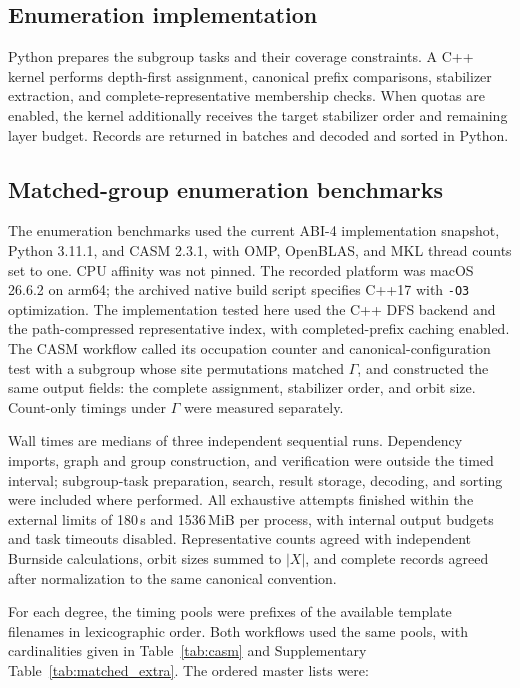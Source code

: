 \documentclass[a5paper, 10pt]{article}
\begin{document}
\subsection{Enumeration implementation}
\label{app:enumeration_implementation}

\begingroup\setlength{\emergencystretch}{3em}
Python prepares the subgroup tasks and their coverage constraints. A C++ kernel performs depth-first assignment, canonical prefix comparisons, stabilizer extraction, and complete-representative membership checks. When quotas are enabled, the kernel additionally receives the target stabilizer order and remaining layer budget. Records are returned in batches and decoded and sorted in Python.
\par\endgroup

\begingroup\setlength{\emergencystretch}{3em}
\subsection{Matched-group enumeration benchmarks}
\label{app:enum_benchmark}

The enumeration benchmarks used the current ABI-4 implementation snapshot, Python 3.11.1, and CASM 2.3.1, with OMP, OpenBLAS, and MKL thread counts set to one. CPU affinity was not pinned. The recorded platform was macOS 26.6.2 on arm64; the archived native build script specifies C++17 with \texttt{-O3} optimization. The implementation tested here used the C++ DFS backend and the path-compressed representative index, with completed-prefix caching enabled. The CASM workflow called its occupation counter and canonical-configuration test with a subgroup whose site permutations matched $\Gamma$, and constructed the same output fields: the complete assignment, stabilizer order, and orbit size. Count-only timings under $\Gamma$ were measured separately.

Wall times are medians of three independent sequential runs. Dependency imports, graph and group construction, and verification were outside the timed interval; subgroup-task preparation, search, result storage, decoding, and sorting were included where performed. All exhaustive attempts finished within the external limits of 180\,s and 1536\,MiB per process, with internal output budgets and task timeouts disabled. Representative counts agreed with independent Burnside calculations, orbit sizes summed to $|X|$, and complete records agreed after normalization to the same canonical convention.

For each degree, the timing pools were prefixes of the available template filenames in lexicographic order. Both workflows used the same pools, with cardinalities given in Table~\ref{tab:casm} and Supplementary Table~\ref{tab:matched_extra}. The ordered master lists were:
\end{document}
